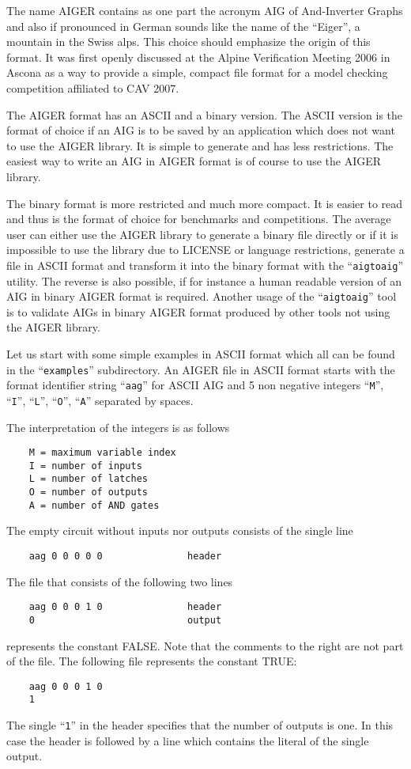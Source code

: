 \documentclass[10pt]{llncs}
\begin{document}
  The name AIGER contains as one part the acronym AIG of And-Inverter
  Graphs and also if pronounced in German sounds like the name of the
  ``Eiger'', a mountain in the Swiss alps.  This choice should emphasize the
  origin of this format. It was first openly discussed at the Alpine
  Verification Meeting 2006 in Ascona as a way to provide a simple, compact
  file format for a model checking competition affiliated to CAV 2007.

  The AIGER format has an ASCII and a binary version.  The ASCII version is
  the format of choice if an AIG is to be saved by an application which
  does not want to use the AIGER library.  It is simple to generate and has
  less restrictions.  The easiest way to write an AIG in AIGER format is of
  course to use the AIGER library.
  
  The binary format is more restricted and much more compact.  It is easier
  to read and thus is the format of choice for benchmarks and competitions.
  The average user can either use the AIGER library to generate a binary
  file directly or if it is impossible to use the library due to LICENSE or
  language restrictions, generate a file in ASCII format and transform
  it into the binary format with the ``\texttt{aigtoaig}'' utility.
  The reverse is also
  possible, if for instance a human readable version of an AIG in binary
  AIGER format is required.  Another usage of the ``\texttt{aigtoaig}'' tool is to
  validate AIGs in binary AIGER format produced by other tools not using
  the AIGER library.

  Let us start with some simple examples in ASCII format which all can be
  found in the ``\texttt{examples}'' subdirectory.  An AIGER file in ASCII format
  starts with the format identifier string ``\texttt{aag}'' for ASCII AIG and 5 non
  negative integers ``\texttt{M}'', ``\texttt{I}'', ``\texttt{L}'', ``\texttt{O}'',
  ``\texttt{A}'' separated by spaces.

  The interpretation of the integers is as follows
\begin{verbatim}
    M = maximum variable index
    I = number of inputs
    L = number of latches
    O = number of outputs
    A = number of AND gates
\end{verbatim}
  The empty circuit without inputs nor outputs consists of the single line
\begin{verbatim}
    aag 0 0 0 0 0               header
\end{verbatim}
  
  The file that consists of the following two lines
\begin{verbatim}
    aag 0 0 0 1 0               header
    0                           output
\end{verbatim}
  represents the constant FALSE.  Note that the comments to the right are
  not part of the file.  The following file represents the constant TRUE:
\begin{verbatim}
    aag 0 0 0 1 0
    1
\end{verbatim}
  The single ``\texttt{1}'' in the header specifies that the number of outputs is one.
  In this case the header is followed by a line which contains the literal
  of the single output.
\end{document}
